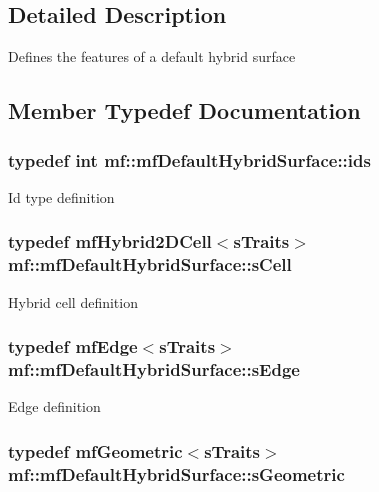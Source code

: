 \subsection{Detailed Description}
Defines the features of a default hybrid surface 

\subsection{Member Typedef Documentation}
\hypertarget{structmf_1_1mfDefaultHybridSurface_a06ff6d28f156383ae914862d15231cf6}{
\subsubsection[{ids}]{\setlength{\rightskip}{0pt plus 5cm}typedef int {\bf mf::mfDefaultHybridSurface::ids}}}
\label{structmf_1_1mfDefaultHybridSurface_a06ff6d28f156383ae914862d15231cf6}
Id type definition \hypertarget{structmf_1_1mfDefaultHybridSurface_aba9244a2c4a635841589c4ff27b1eaaa}{
\subsubsection[{sCell}]{\setlength{\rightskip}{0pt plus 5cm}typedef {\bf mfHybrid2DCell}$<${\bf sTraits}$>$ {\bf mf::mfDefaultHybridSurface::sCell}}}
\label{structmf_1_1mfDefaultHybridSurface_aba9244a2c4a635841589c4ff27b1eaaa}
Hybrid cell definition \hypertarget{structmf_1_1mfDefaultHybridSurface_a5c8e36a36a12cce1d11af275786101d8}{
\subsubsection[{sEdge}]{\setlength{\rightskip}{0pt plus 5cm}typedef {\bf mfEdge}$<${\bf sTraits}$>$ {\bf mf::mfDefaultHybridSurface::sEdge}}}
\label{structmf_1_1mfDefaultHybridSurface_a5c8e36a36a12cce1d11af275786101d8}
Edge definition \hypertarget{structmf_1_1mfDefaultHybridSurface_ae5b965dae8d0d44fffca8f6c2819487c}{
\subsubsection[{sGeometric}]{\setlength{\rightskip}{0pt plus 5cm}typedef {\bf mfGeometric}$<${\bf sTraits}$>$ {\bf mf::mfDefaultHybridSurface::sGeometric}}}

